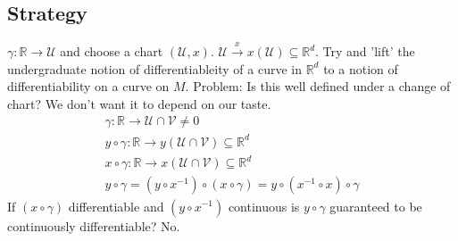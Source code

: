 \documentclass[10pt, oneside]{article}
\newcommand{\R}{\mathbb{R}}
\begin{document}
  \subsection{Strategy}
     $\gamma: \R \to \mathcal{U}$ and choose a chart $(\mathcal{U},x)$. $\mathcal{U} \xrightarrow{x} x(\mathcal{U}) \subseteq \R^d$.
     Try and 'lift' the undergraduate notion of differentiableity of a curve in $\R^d$ to a notion of differentiability on a curve on $M$.
     Problem: Is this well defined under a change of chart? We don't want it to depend on our taste.
     \begin{align}
        \gamma: \R \to\mathcal{U} \cap \mathcal{V} \neq 0 \\
        y \circ \gamma: \R \to y(\mathcal{U} \cap \mathcal{V}) \subseteq \R^d \\
        x \circ \gamma: \R \to x(\mathcal{U} \cap \mathcal{V}) \subseteq \R^d \\
        y \circ \gamma = (y \circ x^{-1}) \circ (x \circ \gamma) = y \circ (x^{-1} \circ x) \circ \gamma
     \end{align}
     If $(x \circ \gamma)$ differentiable and $(y \circ x^{-1})$ continuous is $y \circ \gamma$ guaranteed to be continuously differentiable? No.
\end{document}
